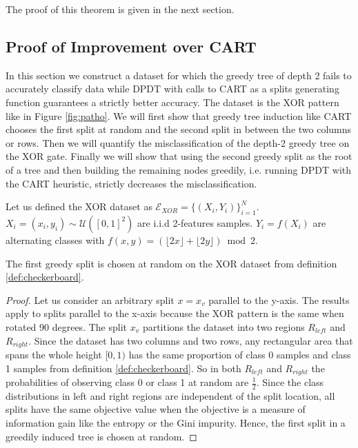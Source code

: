The proof of this theorem is given in the next section.

\subsection{Proof of Improvement over CART}\label{proof-improve-opt}
In this section we construct a dataset for which the greedy tree of depth 2 fails to accurately classify data while DPDT with calls to CART as a splits generating function guarantees a strictly better accuracy. The dataset is the XOR pattern like in Figure \ref{fig:patho}. We will first show that greedy tree induction like CART chooses the first split at random and the second split in between the two columns or rows. Then we will quantify the misclassification of the depth-2 greedy tree on the XOR gate. Finally we will show that using the second greedy split as the root of a tree and then building the remaining nodes greedily, i.e. running DPDT with the CART heuristic, strictly decreases the misclassification. 
\begin{definition}\label{def:checkerboard}
     Let us defined the XOR dataset as $\mathcal{E}_{XOR} = \{(X_i, Y_i)\}_{i=1}^N$. $X_i = (x_i, y_i) \sim \mathcal{U}([0,1]^2)$ are i.i.d 2-features samples. $Y_i = f(X_i)$ are alternating classes with $f(x,y) = (\lfloor 2x \rfloor + \lfloor 2y \rfloor) \bmod 2$.
\end{definition}

\begin{lemma} The first greedy split is chosen at random on the XOR dataset from definition \ref{def:checkerboard}.
\end{lemma}\label{lem:first-split}
\begin{proof}
Let us consider an arbitrary split $x = x_v$ parallel to the y-axis. The results apply to splits parallel to the x-axis because the XOR pattern is the same when rotated 90 degrees. The split $x_v$ partitions the dataset into two regions $R_{left}$ and $R_{right}$. Since the dataset has two columns and two rows, any rectangular area that spans the whole height $[0,1)$ has the same proportion of class 0 samples and class 1 samples from definition \ref{def:checkerboard}. So in both $R_{left}$ and $R_{right}$ the probabilities of observing class 0 or class 1 at random are $\frac{1}{2}$. Since the class distributions in left and right regions are independent of the split location, all splits have the same objective value when the objective is a measure of information gain like the entropy or the Gini impurity. Hence, the first split in a greedily induced tree is chosen at random.
\end{proof}

